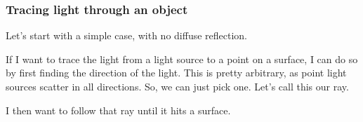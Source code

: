 \documentclass[12pt]{beamer}
\begin{document}
\begin{frame}
\begin{itemize}



    \end{itemize}
  \end{frame}

  \begin{frame}
    \frametitle{Tracing light through an object}
    Let's start with a simple case, with no diffuse reflection.

    If I want to trace the light from a light source to a point on a surface, I can do so by first finding the direction of the light.
    This is pretty arbitrary, as point light sources scatter in all directions.
    So, we can just pick one.
    Let's call this our ray.


    I then want to follow that ray until it hits a surface.


  \end{frame}
\end{document}

